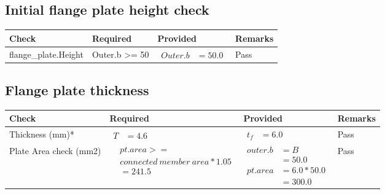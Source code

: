\documentclass{article}%
\begin{document}
%
\newpage%
\subsection{Initial flange plate height check}%
\label{subsec:Initialflangeplateheightcheck}%
\renewcommand{\arraystretch}{1.2}%
\begin{longtable}{|p{4.5cm}|p{2.5cm}|p{7cm}|p{1.5cm}|}%
\hline%
\rowcolor{OsdagGreen}%
Check&Required&Provided&Remarks\\%
\hline%
\endhead%
\hline%
flange\_plate.Height&Outer.b >= 50&$\begin{aligned} Outer.b &=50.0\end{aligned}$&Pass\\%
\hline%
\end{longtable}

%
\newpage%
\subsection{Flange plate thickness}%
\label{subsec:Flangeplatethickness}%
\renewcommand{\arraystretch}{1.2}%
\begin{longtable}{|p{2.5cm}|p{4.5cm}|p{7cm}|p{1.5cm}|}%
\hline%
\rowcolor{OsdagGreen}%
Check&Required&Provided&Remarks\\%
\hline%
\endhead%
\hline%
Thickness (mm)*&$\begin{aligned} T &=4.6\end{aligned}$&$\begin{aligned} t_f &=6.0\end{aligned}$&Pass\\%
\hline%
Plate Area check (mm2)&$\begin{aligned} &pt.area >= \\&connected~member~area * 1.05\\  &= 241.5\end{aligned}$&$\begin{aligned} outer.b &= B\\ &= 50.0\\  pt.area &= 6.0 * 50.0\\ &= 300.0\end{aligned}$&Pass\\%
\hline%
\end{longtable}

%
\newpage%
\end{document}
